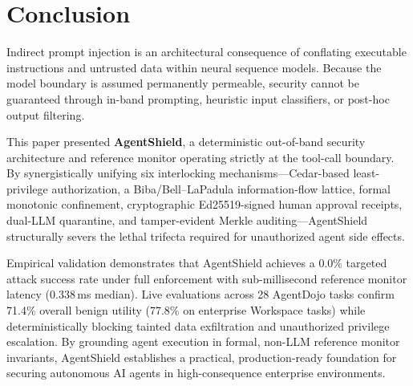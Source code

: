 \documentclass[10pt,conference]{IEEEtran}
\begin{document}
\section{Conclusion}

Indirect prompt injection is an architectural consequence of conflating executable
instructions and untrusted data within neural sequence models. Because the model
boundary is assumed permanently permeable, security cannot be guaranteed through
in-band prompting, heuristic input classifiers, or post-hoc output filtering.

This paper presented \textbf{AgentShield}, a deterministic out-of-band security
architecture and reference monitor operating strictly at the tool-call boundary.
By synergistically unifying six interlocking mechanisms---Cedar-based least-privilege
authorization, a Biba/Bell--LaPadula information-flow lattice, formal monotonic
confinement, cryptographic Ed25519-signed human approval receipts, dual-LLM quarantine,
and tamper-evident Merkle auditing---AgentShield structurally severs the lethal trifecta
required for unauthorized agent side effects.

Empirical validation demonstrates that AgentShield achieves a 0.0\% targeted attack success
rate under full enforcement with sub-millisecond reference monitor latency (0.338\,ms median).
Live evaluations across 28 AgentDojo tasks confirm 71.4\% overall benign utility (77.8\% on
enterprise Workspace tasks) while deterministically blocking tainted data exfiltration and
unauthorized privilege escalation. By grounding agent execution in formal, non-LLM reference
monitor invariants, AgentShield establishes a practical, production-ready foundation for
securing autonomous AI agents in high-consequence enterprise environments.
\end{document}
